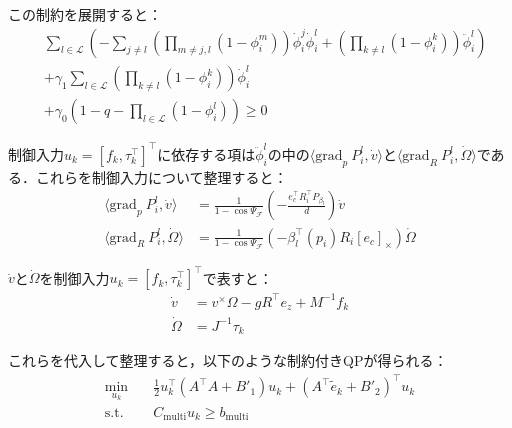 この制約を展開すると：
\begin{equation}
\begin{aligned}
&\sum_{l \in \mathcal{L}} \left(-\sum_{j \neq l} \left(\prod_{m \neq j, l} (1 - \phi_i^m)\right) \dot{\phi}_i^j \dot{\phi}_i^l + \left(\prod_{k \neq l} (1 - \phi_i^k)\right) \ddot{\phi}_i^l\right) \\
&+ \gamma_1 \sum_{l \in \mathcal{L}} \left(\prod_{k \neq l} (1 - \phi_i^k)\right) \dot{\phi}_i^l \\
&+ \gamma_0 (1 - q - \prod_{l \in \mathcal{L}} (1 - \phi_i^l)) \geq 0
\label{eq:multi_hocbf_constraint_expanded}
\end{aligned}
\end{equation}

制御入力$u_k = [f_k, \tau_k^\top]^\top$に依存する項は$\ddot{\phi}_i^l$の中の$\langle \mathrm{grad}_p\:P_i^l, \dot{v} \rangle$と$\langle \mathrm{grad}_R\:P_i^l, \dot{\Omega} \rangle$である．これらを制御入力について整理すると：
\begin{equation}
\begin{aligned}
\langle \mathrm{grad}_p\:P_i^l, \dot{v} \rangle &= \frac{1}{1 - \cos\Psi_\mathcal{F}} \left(-\frac{e_c^\top R_i^\top P_{\beta_l}}{d}\right) \dot{v} \\
\langle \mathrm{grad}_R\:P_i^l, \dot{\Omega} \rangle &= \frac{1}{1 - \cos\Psi_\mathcal{F}} (-\beta_l^\top(p_i) R_i [e_c]_\times) \dot{\Omega}
\label{eq:multi_grad_input}
\end{aligned}
\end{equation}

$\dot{v}$と$\dot{\Omega}$を制御入力$u_k = [f_k, \tau_k^\top]^\top$で表すと：
\begin{equation}
\begin{aligned}
\dot{v} &= v^\times \Omega - g R^\top e_z + M^{-1} f_k \\
\dot{\Omega} &= J^{-1} \tau_k
\label{eq:multi_acceleration}
\end{aligned}
\end{equation}

これらを代入して整理すると，以下のような制約付きQPが得られる：
\begin{equation}
\begin{aligned}
\min_{u_k} \quad & \frac{1}{2} u_k^\top (A^\top A + B'_1) u_k + (A^\top \tilde{e}_k + B'_2)^\top u_k \\
\mathrm{s.t.} \quad & C_{\mathrm{multi}} u_k \geq b_{\mathrm{multi}}
\label{eq:multi_hocbf_qp}
\end{aligned}
\end{equation}

